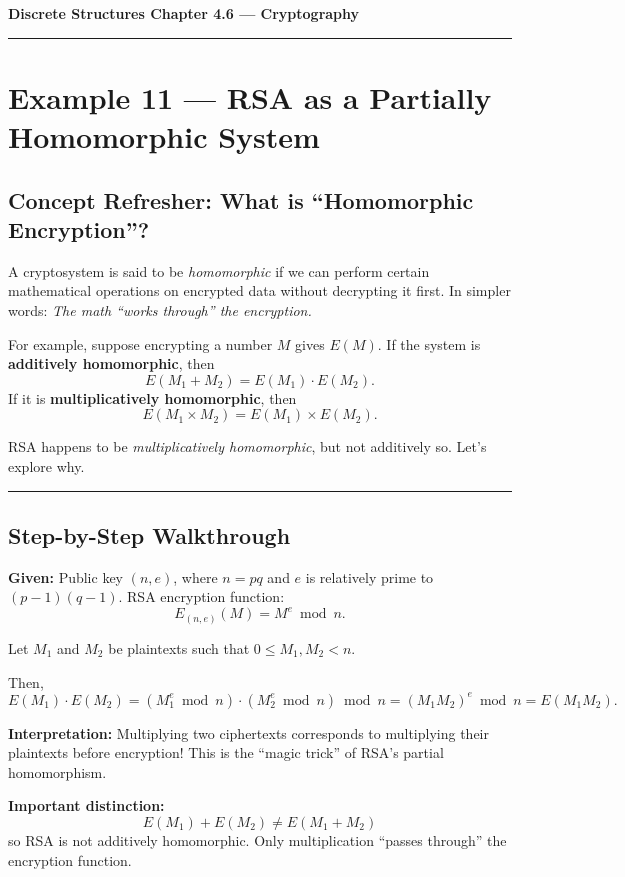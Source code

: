 \documentclass[12pt]{article}
\begin{document}
{\large \textbf{Discrete Structures \quad Chapter 4.6 — Cryptography}}

\hrule
\vspace{0.6em}

\section*{Example 11 — RSA as a Partially Homomorphic System}

\subsection*{Concept Refresher: What is “Homomorphic Encryption”?}
A cryptosystem is said to be \emph{homomorphic} if we can perform certain mathematical
operations on encrypted data without decrypting it first.
In simpler words:  
\emph{The math “works through” the encryption.}

For example, suppose encrypting a number $M$ gives $E(M)$.
If the system is \textbf{additively homomorphic}, then  
\[
E(M_1 + M_2) = E(M_1) \cdot E(M_2).
\]
If it is \textbf{multiplicatively homomorphic}, then  
\[
E(M_1 \times M_2) = E(M_1) \times E(M_2).
\]

RSA happens to be \emph{multiplicatively homomorphic}, but not additively so.
Let’s explore why.

\bigskip
\hrule
\vspace{0.5em}

\subsection*{Step-by-Step Walkthrough}

\textbf{Given:}  
Public key $(n,e)$, where $n = pq$ and $e$ is relatively prime to $(p-1)(q-1)$.  
RSA encryption function:
\[
E_{(n,e)}(M) = M^e \bmod n.
\]

Let $M_1$ and $M_2$ be plaintexts such that $0 \le M_1, M_2 < n$.

Then,
\[
E(M_1) \cdot E(M_2)
  = (M_1^e \bmod n)\cdot(M_2^e \bmod n) \bmod n
  = (M_1 M_2)^e \bmod n
  = E(M_1 M_2).
\]

\textbf{Interpretation:}  
Multiplying two ciphertexts corresponds to multiplying their plaintexts before encryption!  
This is the “magic trick” of RSA’s partial homomorphism.

\bigskip
\textbf{Important distinction:}  
\[
E(M_1) + E(M_2) \neq E(M_1 + M_2)
\]
so RSA is not additively homomorphic.  
Only multiplication “passes through” the encryption function.
\end{document}
